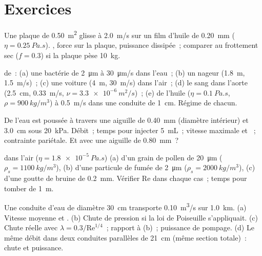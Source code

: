 \section{Exercices}

\begin{exercise}[$\star$]\label{exo:b2:viscous-flows:1}
Une plaque de \qty{0.50}{m^2} glisse à \qty{2.0}{m/s} sur un film d'huile de \qty{0.20}{mm}
($\eta = \qty{0.25}{Pa.s}$). , force sur la plaque, puissance
dissipée~; comparer au frottement sec ($f = 0.3$) si la plaque pèse
\qty{10}{kg}.
\end{exercise}

\begin{exercise}[$\star$]\label{exo:b2:viscous-flows:2}
 de~: (a) une bactérie de \qty{2}{\micro m} à \qty{30}{\micro m/s} dans
l'eau~; (b) un nageur (\qty{1.8}{m}, \qty{1.5}{m/s})~; (c) une voiture (\qty{4}{m},
\qty{30}{m/s}) dans l'air~; (d) le sang dans l'aorte (\qty{2.5}{cm}, \qty{0.33}{m/s},
$\nu = \qty{3.3e-6}{m^2/s}$)~; (e) de l'huile ($\eta = \qty{0.1}{Pa.s}$, $\rho =
\qty{900}{kg/m^3}$) à \qty{0.5}{m/s} dans une conduite de \qty{1}{cm}. Régime de chacun.
\end{exercise}

\begin{exercise}[$\star$]\label{exo:b2:viscous-flows:3}
De l'eau est poussée à travers une aiguille de \qty{0.40}{mm} (diamètre intérieur) et \qty{3.0}{cm}
sous \qty{20}{kPa}. Débit~; temps pour injecter \qty{5}{mL}~; vitesse maximale
et ~; contrainte pariétale. Et avec une aiguille de \qty{0.80}{mm}~?
\end{exercise}

\begin{exercise}[$\star$]\label{exo:b2:viscous-flows:4}
 dans l'air ($\eta = \qty{1.8e-5}{Pa.s}$) (a) d'un grain de pollen de \qty{20}{\micro m}
($\rho_s = \qty{1100}{kg/m^3}$), (b) d'une particule de fumée de \qty{2}{\micro m}
($\rho_s = \qty{2000}{kg/m^3}$), (c) d'une goutte de bruine de \qty{0.2}{mm}.
Vérifier $\mathrm{Re}$ dans chaque cas~; temps pour tomber de \qty{1}{m}.
\end{exercise}

\begin{exercise}[$\star\star$]\label{exo:b2:viscous-flows:5}
Une conduite d'eau de diamètre \qty{30}{cm} transporte \qty{0.10}{m^3/s} sur
\qty{1.0}{km}. (a) Vitesse moyenne et . (b) Chute de pression si
la loi de Poiseuille s'appliquait. (c) Chute réelle avec $\lambda = 0.3/\mathrm{Re}^{1/4}$~;
rapport à (b)~; puissance de pompage. (d) Le même débit dans deux conduites
parallèles de \qty{21}{cm} (même section totale)~: chute et puissance.
\end{exercise}

